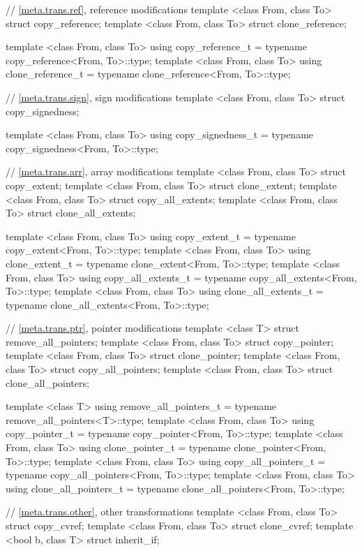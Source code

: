 \documentclass[ebook,10pt,oneside,openany,final]{memoir}
\begin{document}
\begin{codeblock}
{    // \ref{meta.trans.ref}, reference modifications
    template <class From, class To> struct copy_reference;
    template <class From, class To> struct clone_reference;

    template <class From, class To>
    using copy_reference_t = typename copy_reference<From, To>::type;
    template <class From, class To>
    using clone_reference_t = typename clone_reference<From, To>::type;
    
    // \ref{meta.trans.sign}, sign modifications
    template <class From, class To> struct copy_signedness;

    template <class From, class To>
    using copy_signedness_t = typename copy_signedness<From, To>::type;
    
    // \ref{meta.trans.arr}, array modifications
    template <class From, class To> struct copy_extent;
    template <class From, class To> struct clone_extent;
    template <class From, class To> struct copy_all_extents;
    template <class From, class To> struct clone_all_extents;

    template <class From, class To>
    using copy_extent_t = typename copy_extent<From, To>::type;
    template <class From, class To>
    using clone_extent_t = typename clone_extent<From, To>::type;
    template <class From, class To>
    using copy_all_extents_t = typename copy_all_extents<From, To>::type;
    template <class From, class To>
    using clone_all_extents_t = typename clone_all_extents<From, To>::type;
    
    // \ref{meta.trans.ptr}, pointer modifications
    template <class T> struct remove_all_pointers;
    template <class From, class To> struct copy_pointer;
    template <class From, class To> struct clone_pointer;
    template <class From, class To> struct copy_all_pointers;
    template <class From, class To> struct clone_all_pointers;

    template <class T>
    using remove_all_pointers_t = typename remove_all_pointers<T>::type;
    template <class From, class To>
    using copy_pointer_t = typename copy_pointer<From, To>::type;
    template <class From, class To>
    using clone_pointer_t = typename clone_pointer<From, To>::type;
    template <class From, class To>
    using copy_all_pointers_t = typename copy_all_pointers<From, To>::type;
    template <class From, class To>
    using clone_all_pointers_t = typename clone_all_pointers<From, To>::type;
    
    // \ref{meta.trans.other}, other transformations
    template <class From, class To> struct copy_cvref;
    template <class From, class To> struct clone_cvref;
    template <bool b, class T> struct inherit_if;

}
\end{codeblock}
\end{document}
